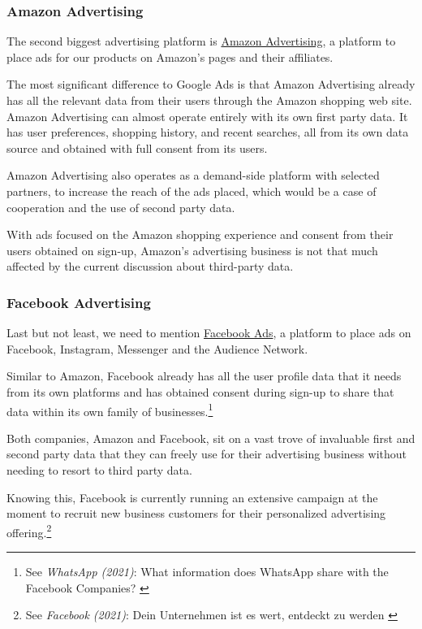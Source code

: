 \subsubsection{Amazon Advertising}

The second biggest advertising platform is \href{https://advertising.amazon.com//}{Amazon Advertising}, a platform to place ads for our products on Amazon's pages and their affiliates.

The most significant difference to Google Ads is that Amazon Advertising already has all the relevant data from their users through the Amazon shopping web site. Amazon Advertising can almost operate entirely with its own first party data. It has user preferences, shopping history, and recent searches, all from its own data source and obtained with full consent from its users.

Amazon Advertising also operates as a demand-side platform with selected partners, to increase the reach of the ads placed, which would be a case of cooperation and the use of second party data.

With ads focused on the Amazon shopping experience and consent from their users obtained on sign-up, Amazon's advertising business is not that much affected by the current discussion about third-party data.

\subsubsection{Facebook Advertising}

Last but not least, we need to mention \href{https://www.facebook.com/business/ads}{Facebook Ads}, a platform to place ads on Facebook, Instagram, Messenger and the Audience Network.

Similar to Amazon, Facebook already has all the user profile data that it needs from its own platforms and has obtained consent during sign-up to share that data within its own family of businesses.\footnote{See \textit{WhatsApp (2021)}: What information does WhatsApp share with the Facebook Companies? \cite{whatsApp}}

Both companies, Amazon and Facebook, sit on a vast trove of invaluable first and second party data that they can freely use for their advertising business without needing to resort to third party data.

Knowing this, Facebook is currently running an extensive campaign at the moment to recruit new business customers for their personalized advertising offering.\footnote{See \textit{Facebook (2021)}: Dein Unternehmen ist es wert, entdeckt zu werden \cite{facebookAds}}

